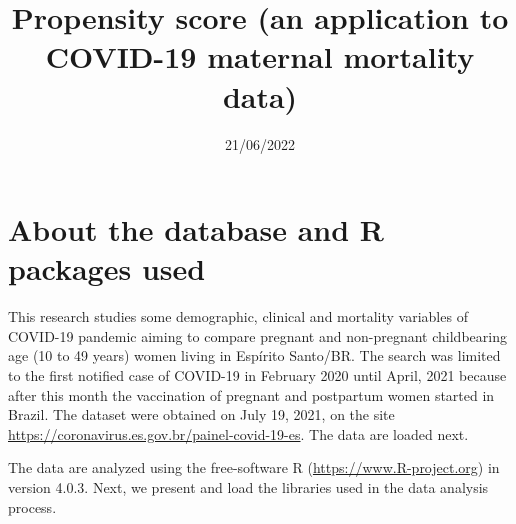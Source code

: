 \documentclass[
]{article}
\title{Propensity score (an application to COVID-19 maternal mortality
data)}
\author{}
\date{\vspace{-2.5em}21/06/2022}
\begin{document}
\maketitle

\hypertarget{about-the-database-and-r-packages-used}{%
\section{About the database and R packages
used}\label{about-the-database-and-r-packages-used}}

This research studies some demographic, clinical and mortality variables
of COVID-19 pandemic aiming to compare pregnant and non-pregnant
childbearing age (10 to 49 years) women living in Espírito Santo/BR. The
search was limited to the first notified case of COVID-19 in February
2020 until April, 2021 because after this month the vaccination of
pregnant and postpartum women started in Brazil. The dataset were
obtained on July 19, 2021, on the site
\url{https://coronavirus.es.gov.br/painel-covid-19-es}. The data are
loaded next.

The data are analyzed using the free-software R
(\url{https://www.R-project.org}) in version 4.0.3. Next, we present and
load the libraries used in the data analysis process.
\end{document}
